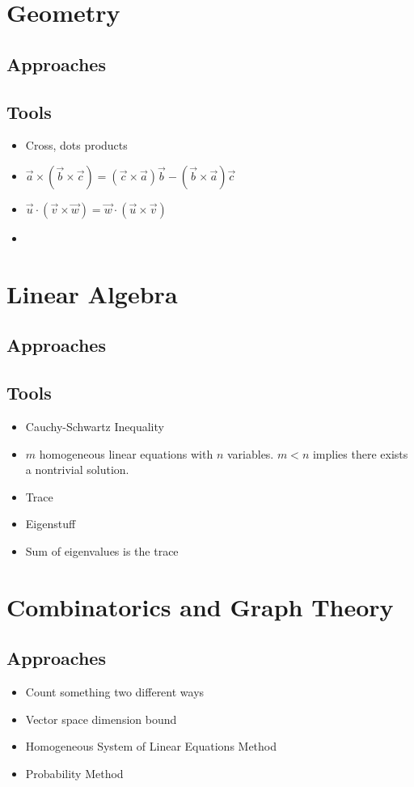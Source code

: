 \documentclass[12pt]{amsart}
\begin{document}
\begin{multicols}{2}
\section{Geometry}
\subsection{Approaches}
\subsection{Tools}
\begin{itemize}
    \item Cross, dots products
    \item $\vec{a} \times (\vec{b} \times \vec{c}) = (\vec{c} \times \vec{a}) \vec{b} - (\vec{b} \times \vec{a}) \vec{c}$
    \item $\vec{u} \cdot (\vec{v} \times \vec{w}) = \vec{w} \cdot (\vec{u} \times \vec{v})$
    \item 
\end{itemize}
\section{Linear Algebra}
\subsection{Approaches}
\subsection{Tools}
\begin{itemize}
    \item Cauchy-Schwartz Inequality
    \item $m$ homogeneous linear equations with $n$ variables. $m < n$ implies
        there exists a nontrivial solution.
    \item Trace
    \item Eigenstuff
    \item Sum of eigenvalues is the trace
\end{itemize}

\section{Combinatorics and Graph Theory}
\subsection{Approaches}
\begin{itemize}
    \item Count something two different ways
    \item Vector space dimension bound
    \item Homogeneous System of Linear Equations Method
    \item Probability Method
\end{itemize}


\end{multicols}
\end{document}
